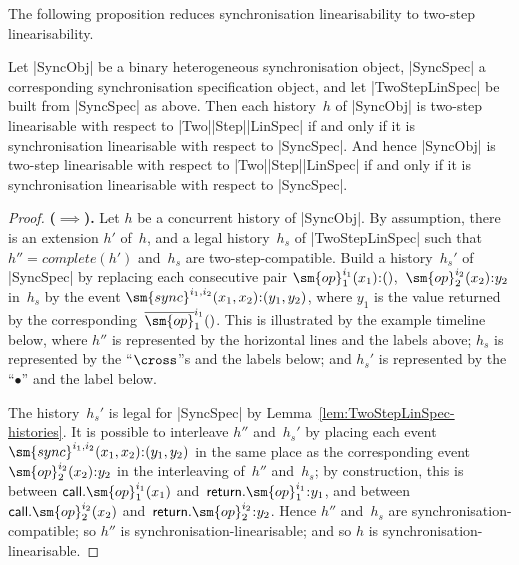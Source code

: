 The following proposition reduces synchronisation linearisability to two-step
linearisability.
%
\begin{prop}
\label{prop:two-step-lin}
Let |SyncObj| be a binary heterogeneous synchronisation object, |SyncSpec| a
corresponding synchronisation specification object, and let |TwoStepLinSpec|
be built from |SyncSpec| as above.  Then each history~$h$ of |SyncObj| is
two-step linearisable with respect to |Two|\-|Step|\-|LinSpec| if and only if
it is synchronisation linearisable with respect to |SyncSpec|.  And hence
|SyncObj| is two-step linearisable with respect to |Two|\-|Step|\-|LinSpec| if
and only if it is synchronisation linearisable with respect to |SyncSpec|.
\end{prop}
\begin{proof}
\textbf{($\implies$).}\quad
%
Let $h$ be a concurrent history of |SyncObj|.  By assumption, there is an
extension $h'$ of~$h$, and a legal history~$h_s$ of |TwoStepLinSpec| such that
$h'' = complete(h')$ and~$h_s$ are two-step-compatible.
%
Build a history~$h_s'$ of |SyncSpec| by replacing each consecutive pair
$\sm{op}_1^{i_1}(x_1) \:: ()$,\, $\sm{op}_2^{i_2}(x_2) \:: y_2$ in~$h_s$ by
the event $\sm{sync}^{i_1,i_2}(x_1,x_2) \:: (y_1,y_2)$, where $y_1$ is the
value returned by the corresponding~$\overline{\sm{op}}_1^{i_1}()$.
%
This is illustrated by the example timeline below, where $h''$ is represented
by the horizontal lines and the labels above; $h_s$ is represented by the
``$\cross$''s and the labels below; and $h_s'$ is represented by the
``$\bullet$'' and the label below.
%
\begin{center}
\end{center}

The history~$h_s'$ is legal for |SyncSpec| by
Lemma~\ref{lem:TwoStepLinSpec-histories}.
%
It is possible to interleave $h''$ and~$h_s'$ by placing each event
$\sm{sync}^{i_1,i_2}(x_1,x_2) \:: (y_1,y_2)$ in the same place as the
corresponding event $\sm{op}_2^{i_2}(x_2) \:: y_2$ in the interleaving
of~$h''$ and~$h_s$; by construction, this is between
$\call.\sm{op}_1^{i_1}(x_1)$ and~$\return.\sm{op}_1^{i_1} \:: y_1$, and
between $\call.\sm{op}_2^{i_2}(x_2)$ and~$\return.\sm{op}_2^{i_2} \:: y_2$.
%
Hence $h''$ and~$h_s$ are synchronisation-compatible; so $h''$ is
synchronisation-linearisable; and so $h$ is synchronisation-linearisable.


\end{proof}

